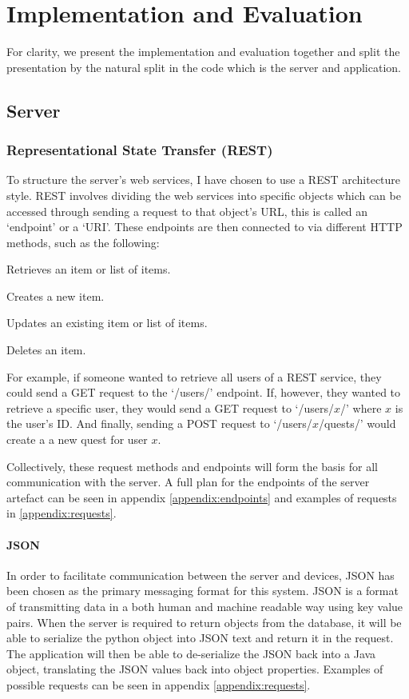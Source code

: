 \chapter{Implementation and Evaluation}

For clarity, we present the implementation and evaluation together and split the presentation by the natural split in the code which is the server and application.

\section{Server}
\subsection{Representational State Transfer (REST)}
To structure the server's web services, I have chosen to use a REST architecture style.
REST involves dividing the web services into specific objects which can be accessed through sending a request to that object's URL, this is called an `endpoint' or a `URI'.
These endpoints are then connected to via different HTTP methods, such as the following:
\begin{description}[align=left]
	\item [GET] Retrieves an item or list of items.
	\item [POST] Creates a new item.
	\item [PUT] Updates an existing item or list of items.
	\item [DELETE] Deletes an item. 
\end{description}
For example, if someone wanted to retrieve all users of a REST service, they could send a GET request to the `/users/' endpoint. 
If, however, they wanted to retrieve a specific user, they would send a GET request to `/users/$x$/' where $x$ is the user's ID.
And finally, sending a POST request to `/users/$x$/quests/' would create a a new quest for user $x$.

Collectively, these request methods and endpoints will form the basis for all communication with the server. 
A full plan for the endpoints of the server artefact can be seen in appendix \ref{appendix:endpoints} and examples of requests in \ref{appendix:requests}.

\subsubsection{JSON}
In order to facilitate communication between the server and devices, JSON has been chosen as the primary messaging format for this system.
JSON is a format of transmitting data in a both human and machine readable way using key value pairs.
When the server is required to return objects from the database, it will be able to serialize the python object into JSON text and return it in the request.
The application will then be able to de-serialize the JSON back into a Java object, translating the JSON values back into object properties.
Examples of possible requests can be seen in appendix \ref{appendix:requests}.

